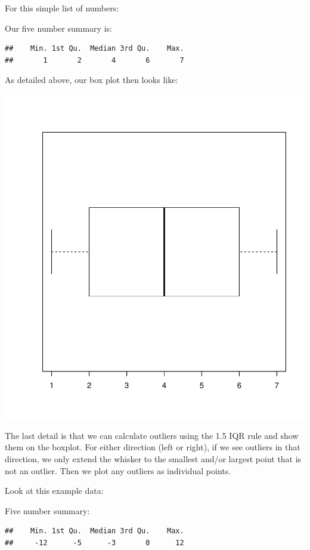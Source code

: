 \documentclass[
]{book}
\begin{document}
For this simple list of numbers:

Our five number summary is:

\begin{verbatim}
##    Min. 1st Qu.  Median 3rd Qu.    Max. 
##       1       2       4       6       7
\end{verbatim}

As detailed above, our box plot then looks like:

\includegraphics{_main_files/figure-latex/unnamed-chunk-22-1.pdf}

The last detail is that we can calculate outliers using the 1.5 IQR rule
and show them on the boxplot. For either direction (left or right), if
we see outliers in that direction, we only extend the whisker to the
smallest and/or largest point that is not an outlier. Then we plot any
outliers as individual points.

Look at this example data:

Five number summary:

\begin{verbatim}
##    Min. 1st Qu.  Median 3rd Qu.    Max. 
##     -12      -5      -3       0      12
\end{verbatim}
\end{document}
